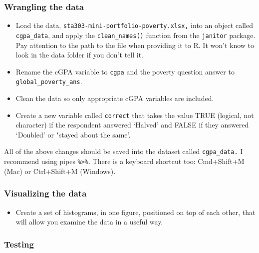 \documentclass[
  openany]{book}
\providecommand{\tightlist}{%
  \setlength{\itemsep}{0pt}\setlength{\parskip}{0pt}}
\begin{document}
\hypertarget{wrangling-the-data}{%
\subsubsection{Wrangling the data}\label{wrangling-the-data}}

\begin{itemize}
\tightlist
\item
  Load the data, \texttt{sta303-mini-portfolio-poverty.xlsx,} into an object called \texttt{cgpa\_data}, and apply the \texttt{clean\_names()} function from the \texttt{janitor} package. Pay attention to the path to the file when providing it to R. It won't know to look in the data folder if you don't tell it.\\
\item
  Rename the cGPA variable to \texttt{cgpa} and the poverty question answer to \texttt{global\_poverty\_ans}.\\
\item
  Clean the data so only appropriate cGPA variables are included.\\
\item
  Create a new variable called \texttt{correct} that takes the value TRUE (logical, not character) if the respondent answered `Halved' and FALSE if they answered `Doubled' or "stayed about the same'.
\end{itemize}

All of the above changes should be saved into the dataset called \texttt{cgpa\_data.} I recommend using pipes \texttt{\%\textgreater{}\%}. There is a keyboard shortcut too: Cmd+Shift+M (Mac) or Ctrl+Shift+M (Windows).

\hypertarget{visualizing-the-data}{%
\subsubsection{Visualizing the data}\label{visualizing-the-data}}

\begin{itemize}
\tightlist
\item
  Create a set of histograms, in one figure, positioned on top of each other, that will allow you examine the data in a useful way.
\end{itemize}

\hypertarget{testing}{%
\subsubsection{Testing}\label{testing}}
\end{document}
